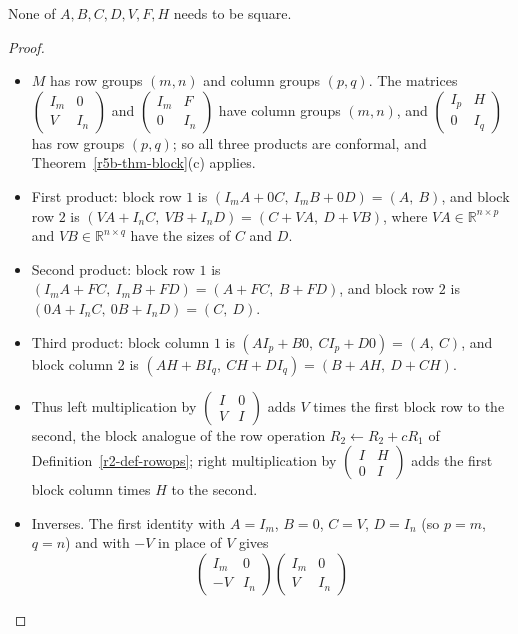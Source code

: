\documentclass[12pt]{article}
\newcommand{\R}{\mathbb R}
\theoremstyle{definition}
\begin{document}
None of \(A,B,C,D,V,F,H\) needs to be square.
\begin{proof}
\begin{itemize}
\item \(M\) has row groups \((m,n)\) and column groups \((p,q)\). The matrices
\(\left(\begin{smallmatrix}I_m&0\\V&I_n\end{smallmatrix}\right)\) and
\(\left(\begin{smallmatrix}I_m&F\\0&I_n\end{smallmatrix}\right)\) have column groups \((m,n)\), and
\(\left(\begin{smallmatrix}I_p&H\\0&I_q\end{smallmatrix}\right)\) has row groups \((p,q)\); so all
three products are conformal, and Theorem~\ref{r5b-thm-block}(c) applies.
\item First product: block row \(1\) is \((I_mA+0C,\ I_mB+0D)=(A,\ B)\), and block row \(2\) is
\((VA+I_nC,\ VB+I_nD)=(C+VA,\ D+VB)\), where \(VA\in\R^{n\times p}\) and \(VB\in\R^{n\times q}\) have
the sizes of \(C\) and \(D\).
\item Second product: block row \(1\) is \((I_mA+FC,\ I_mB+FD)=(A+FC,\ B+FD)\), and block row \(2\)
is \((0A+I_nC,\ 0B+I_nD)=(C,\ D)\).
\item Third product: block column \(1\) is \((AI_p+B0,\ CI_p+D0)=(A,\ C)\), and block column \(2\)
is \((AH+BI_q,\ CH+DI_q)=(B+AH,\ D+CH)\).
\item Thus left multiplication by \(\left(\begin{smallmatrix}I&0\\V&I\end{smallmatrix}\right)\) adds
\(V\) times the first block row to the second, the block analogue of the row operation
\(R_2\leftarrow R_2+cR_1\) of Definition~\ref{r2-def-rowops}; right multiplication by
\(\left(\begin{smallmatrix}I&H\\0&I\end{smallmatrix}\right)\) adds the first block column times
\(H\) to the second.
\item Inverses. The first identity with \(A=I_m\), \(B=0\), \(C=V\), \(D=I_n\) (so \(p=m\),
\(q=n\)) and with \(-V\) in place of \(V\) gives
\[
\begin{pmatrix}I_m&0\\-V&I_n\end{pmatrix}\begin{pmatrix}I_m&0\\V&I_n\end{pmatrix}
\]
\end{itemize}
\end{proof}
\end{document}
